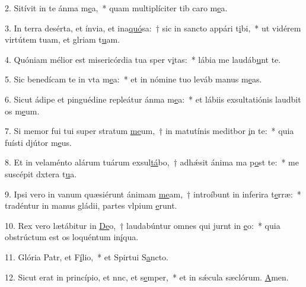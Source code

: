 2. Sitívit in te ánma m\uline{e}a,~* quam multiplíciter tib caro m\uline{e}a.\par 
3. In terra desérta, et ínvia, et ina\uline{quó}sa:~† sic in sancto appári t\uline{i}bi,~* ut vidérem virtútem tuam, et glriam t\uline{u}am.\par 
4. Quóniam mélior est misericórdia tua sper v\uline{i}tas:~* lábia me laudáb\uline{u}nt te.\par 
5. Sic benedícam te in vta m\uline{e}a:~* et in nómine tuo leváb manus m\uline{e}as.\par 
6. Sicut ádipe et pinguédine repleátur ánma m\uline{e}a:~* et lábiis exsultatiónis laudbit os m\uline{e}um.\par 
7. Si memor fui tui super stratum \uline{me}um,~† in matutínis meditbor \uline{i}n te:~* quia fuísti djútor m\uline{e}us.\par 
8. Et in velaménto alárum tuárum exsul\uline{tá}bo,~† adhǽsit ánima ma p\uline{o}st te:~* me suscépit dxtera t\uline{u}a.\par 
9. Ipsi vero in vanum quæsiérunt ánimam \uline{me}am,~† introíbunt in inferira t\uline{e}rræ:~* tradéntur in manus gládii, partes vlpium \uline{e}runt.\par 
10. Rex vero lætábitur in \uline{De}o,~† laudabúntur omnes qui jurnt in \uline{e}o:~* quia obstrúctum est os loquéntum in\uline{í}qua.\par 
11. Glória Patr, et F\uline{í}lio,~* et Spirtui S\uline{a}ncto.\par 
12. Sicut erat in princípio, et nnc, et s\uline{e}mper,~* et in sǽcula sæclórum. \uline{A}men.\par 
